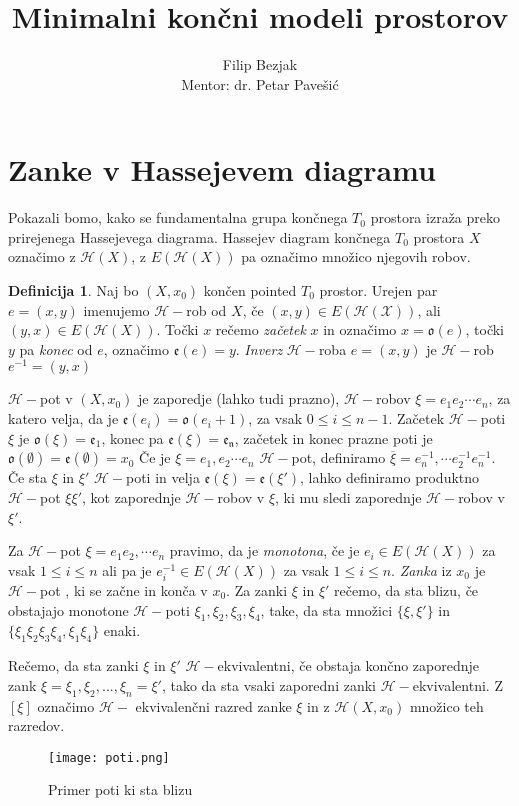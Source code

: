 \documentclass[a4paper,12pt]{article}
\title{Minimalni končni modeli prostorov}
\author{Filip Bezjak \\ Mentor: dr. Petar Pavešić}
\DeclareRobustCommand{\h}{
    \mathcal{H}
}
\DeclareRobustCommand{\pot}{
    $\h-$pot
}
\theoremstyle{definition}
\newtheorem{definicija}{Definicija}
\theoremstyle{plain}
\theoremstyle{definition}
\theoremstyle{plain}
\theoremstyle{plain}
\theoremstyle{plain}
\theoremstyle{plain}
\begin{document}
\section{Zanke v Hassejevem diagramu}

Pokazali bomo, kako se fundamentalna grupa končnega $T_0$ 
prostora izraža preko prirejenega Hassejevega diagrama.
Hassejev diagram končnega $T_0$ prostora $X$ označimo z 
$\h(X)$, z $E(\h(X))$ pa označimo množico njegovih robov.


\begin{definicija}
    Naj bo $(X,x_0)$ končen pointed $T_0$ prostor. Urejen par 
$e=(x,y)$ imenujemo $\mathcal{H}-$rob od $X$, če $(x,y)\in 
E(\mathcal{H}(\mathcal{X}))$, ali $(y,x)\in 
E(\h(X))$. Točki $x$ rečemo \textit{začetek} $x$ in označimo 
$x=\mathfrak{o}(e)$, točki $y$ pa \textit{konec} od $e$, 
označimo $\mathfrak{e}(e)=y$. \textit{Inverz} $\h-$roba $e=(x,y)$ je $\h-$rob $e^{-1}=(y,x)$

$\h-$pot v $(X,x_0)$ je zaporedje (lahko tudi prazno), $\h-$robov $\xi=e_1e_2\cdots e_n$, 
za katero velja, da je $\mathfrak{e}(e_i)=\mathfrak{o}(e_i+1)$, za vsak $0\leq i \leq n-1$.
 Začetek $\h-$poti $\xi$ je  $\mathfrak{o}(\xi)=\mathfrak{e_1}$, konec pa $\mathfrak{e}(\xi)=\mathfrak{e_n}$, 
 začetek in konec prazne poti je $\mathfrak{o}(\emptyset)=\mathfrak{e}(\emptyset)=x_0$
 Če je $\xi=e_1,e_2\cdots e_n$ $\h-$pot, definiramo $\overline{\xi}=e_n^{-1},\cdots 
 e_2^{-1}e_n^{-1}$. Če sta $\xi$ in $\xi'$ $\h-$poti in velja $\mathfrak{e}(\xi)=
 \mathfrak{e}(\xi')$, lahko definiramo produktno \pot $\xi\xi'$, kot zaporednje 
 $\h-$robov v $\xi$, ki mu sledi zaporednje $\h-$robov v $\xi'$.

 Za \pot $\xi=e_1e_2,\cdots e_n$ pravimo, da je \textit{monotona}, če je $e_i\in 
 E(\h(X))$ za vsak $1\leq i \leq n$ ali pa je $e_i^{-1}\in E(\h(X))$ za vsak $1\leq i \leq n$.
 \textit{Zanka} iz $x_0$ je \pot, ki se začne in konča v $x_0$. Za zanki $\xi$ in
  $\xi'$ rečemo, da sta blizu, če obstajajo monotone $\h-$poti $\xi_1,\xi_2,\xi_3,\xi_4$,
   take, da  sta množici $\{\xi,\xi'\}$ in $\{\xi_1\xi_2\xi_3\xi_4,\xi_1\xi_4\}$ enaki.

   Rečemo, da sta zanki $\xi$ in $\xi'$ $\h-$ekvivalentni, če obstaja končno zaporednje zank $\xi=\xi_1,\xi_2,...,\xi_n=\xi'$, tako da sta vsaki zaporedni zanki $\h-$ekvivalentni. Z $[\xi]$ označimo $\h-$ ekvivalenčni razred zanke $\xi$ in z $\mathscr{H}(X,x_0)$ množico teh razredov.
\end{definicija}

    \begin{figure}[h!]
          \centering
          \texttt{[image: poti.png]}
        \caption{Primer poti ki sta blizu}
        \end{figure}
\end{document}
